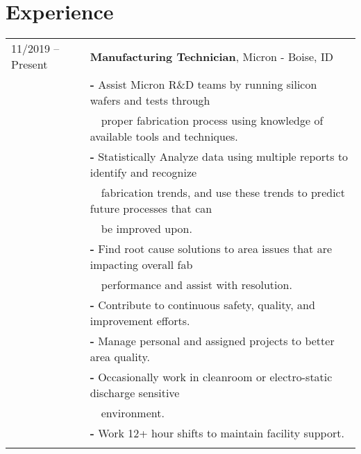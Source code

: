 \documentclass[a4paper,12pt]{article}
\begin{document}
\section{Experience}
\begin{tabular}{ll}
11/2019 -- Present  & \textbf{Manufacturing Technician}, Micron - Boise, ID \\
         & \textbf{-} Assist Micron R\&D teams by running silicon wafers and tests through\\
         & \-\ \-\ proper fabrication process using knowledge of available tools and techniques.\\
         & \textbf{-} Statistically Analyze data using multiple reports to identify and recognize\\
         & \-\ \-\ fabrication trends, and use these trends to predict future processes that can\\
         & \-\ \-\ be improved upon.\\
         & \textbf{-} Find root cause solutions to area issues that are impacting overall fab\\
         & \-\ \-\ performance and assist with resolution.\\
         & \textbf{-} Contribute to continuous safety, quality, and improvement efforts.\\
         & \textbf{-} Manage personal and assigned projects to better area quality.\\
         & \textbf{-} Occasionally work in cleanroom or electro-static discharge sensitive\\
         & \-\ \-\ environment.\\
         & \textbf{-} Work 12+ hour shifts to maintain facility support.\\
         \\
\end{tabular}
\end{document}
